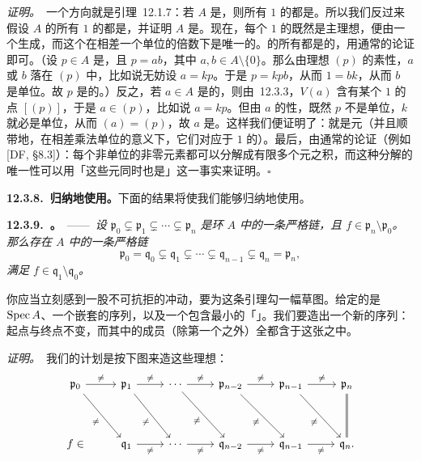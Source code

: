 \emph{证明。}\ 一个方向就是引理~12.1.7：若 $A$ 是\trUFD，则所有\trCodimension{} $1$ 的\trPrimeIdeal{}都是\trPrincipalIdeal。所以我们反过来假设 $A$ 的所有\trCodimension{} $1$ 的\trPrimeIdeal{}都是\trPrincipalIdeal，并证明 $A$ 是\trUFD。现在，每个\trCodimension{} $1$ 的\trPrimeIdeal{}既然是主理想，便由一个\trPrimeElement{}生成，而这个\trPrimeElement{}在相差一个单位的倍数下是唯一的。\trIntegralDomain{}的所有\trPrimeElement{}都是\trIrreducible{}的，用通常的论证即可。（设 $p\in A$ 是\trPrimeElement，且 $p=ab$，其中 $a,b\in A\setminus\{0\}$。那么由理想 $(p)$ 的素性，$a$ 或 $b$ 落在 $(p)$ 中，比如说无妨设 $a=kp$。于是 $p=kpb$，从而 $1=bk$，从而 $b$ 是单位。故 $p$ 是\trIrreducible{}的。）反之，若 $a\in A$ 是\trIrreducible{}的，则由\trKrull{}\trPrincipalIdealTheorem~12.3.3，$V(a)$ 含有某个\trCodimension{} $1$ 的点 $[(p)]$，于是 $a\in(p)$，比如说 $a=kp$。但由 $a$ 的\trIrreducible{}性，既然 $p$ 不是单位，$k$ 就必是单位，从而 $(a)=(p)$，故 $a$ 是\trPrimeElement。这样我们便证明了：\trPrimeElement{}就是\trIrreducible{}元（并且顺带地，在相差乘法单位的意义下，它们对应于\trCodimension{} $1$ 的\trPrimeIdeal）。最后，由通常的论证（例如 [DF, \S8.3]）：每个非单位的非零元素都可以分解成有限多个\trIrreducible{}元之积，而这种分解的唯一性可以用「这些\trIrreducible{}元同时也是\trPrimeElement」这一事实来证明。\hfill$\square$

\textbf{12.3.8.\ 归纳地使用\trKrull{}\trPrincipalIdealTheorem。}\quad 下面的结果将使我们能够归纳地使用\trKrull{}\trPrincipalIdealTheorem。

\textbf{12.3.9.\ \trhLemma{}。}\ ——\ \emph{设 $\mathfrak{p}_0\subsetneq\mathfrak{p}_1\subsetneq\cdots\subsetneq\mathfrak{p}_n$ 是\trNoetherian{}环 $A$ 中的一条严格\trPrimeIdeal{}链，且 $f\in\mathfrak{p}_n\setminus\mathfrak{p}_0$。那么存在 $A$ 中的一条严格\trPrimeIdeal{}链}
\[
\mathfrak{p}_0=\mathfrak{q}_0\subsetneq\mathfrak{q}_1\subsetneq\cdots\subsetneq\mathfrak{q}_{n-1}\subsetneq\mathfrak{q}_n=\mathfrak{p}_n,
\]
\emph{满足 $f\in\mathfrak{q}_1\setminus\mathfrak{q}_0$。}

你应当立刻感到一股不可抗拒的冲动，要为这条引理勾一幅草图。给定的是 $\operatorname{Spec} A$、一个嵌套的\trIrreducible{}\trClosedSubset{}序列，以及一个包含最小\trClosedSubset{}的「\trHypersurface」。我们要造出一个新的\trIrreducible{}\trClosedSubset{}序列：起点与终点不变，而其中的成员（除第一个之外）全都含于这张\trHypersurface{}之中。

\emph{证明。}\ 我们的计划是按下图来造这些理想：
\[
\begin{tikzcd}[row sep=3.6em, column sep=2.4em]
\mathfrak{p}_0 \ar[r, "\neq"] \ar[rd, "\neq"'] &
\mathfrak{p}_1 \ar[r, "\neq"] \ar[rd, "\neq"'] &
\cdots \ar[r, "\neq"] \ar[rd, "\neq"'] &
\mathfrak{p}_{n-2} \ar[r, "\neq"] \ar[rd, "\neq"'] &
\mathfrak{p}_{n-1} \ar[r, "\neq"] \ar[rd, "\neq"'] &
\mathfrak{p}_n \ar[d, no head, double] \\
f\in & \mathfrak{q}_1 \ar[r, "\neq"'] &
\cdots \ar[r, "\neq"'] &
\mathfrak{q}_{n-2} \ar[r, "\neq"'] &
\mathfrak{q}_{n-1} \ar[r, "\neq"'] &
\mathfrak{q}_n.
\end{tikzcd}
\]

